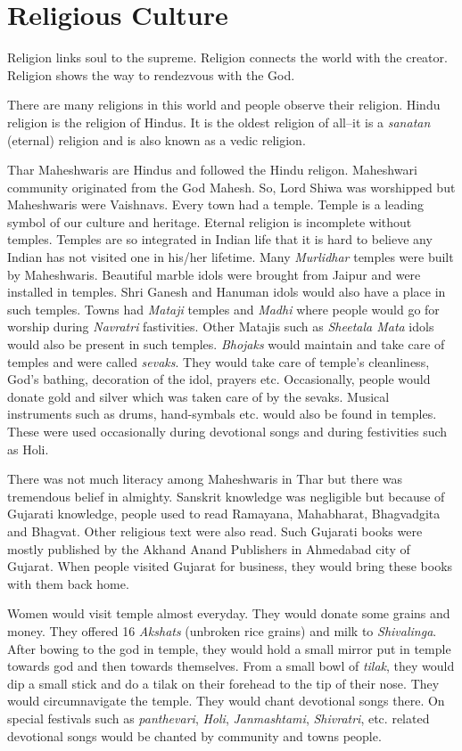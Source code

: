 \chapter{Religious Culture}
Religion links soul to the supreme. Religion connects the world with the
creator. Religion shows the way to rendezvous with the God.

There are many religions in this world and people observe their religion. Hindu
religion is the religion of Hindus. It is the oldest religion of all--it is a
\textit{sanatan} (eternal) religion and is also known as a vedic religion.

Thar Maheshwaris are Hindus and followed the Hindu religon. Maheshwari
community originated from the God Mahesh. So, Lord Shiwa was worshipped but
Maheshwaris were Vaishnavs. Every town had a temple. Temple is a leading symbol
of our culture and heritage. Eternal religion is incomplete without temples.
Temples are so integrated in Indian life that it is hard to believe any Indian
has not visited one in his/her lifetime. Many \textit{Murlidhar} temples were
built by Maheshwaris. Beautiful marble idols were brought from Jaipur and were
installed in temples. Shri Ganesh and Hanuman idols would also have a place in
such temples. Towns had \textit{Mataji} temples and \textit{Madhi} where people
would go for worship during \textit{Navratri} fastivities. Other Matajis such
as \textit{Sheetala Mata} idols would also be present in such temples.
\textit{Bhojaks} would maintain and take care of temples and were called
\textit{sevaks}. They would take care of temple's cleanliness, God's bathing,
decoration of the idol, prayers etc. Occasionally, people would donate gold and
silver which was taken care of by the sevaks. Musical instruments such as
drums, hand-symbals etc. would also be found in temples. These were used
occasionally during devotional songs and during festivities such as Holi.

There was not much literacy among Maheshwaris in Thar but there was tremendous
belief in almighty. Sanskrit knowledge was negligible but because of Gujarati
knowledge, people used to read Ramayana, Mahabharat, Bhagvadgita and Bhagvat.
Other religious text were also read. Such Gujarati books were mostly published
by the Akhand Anand Publishers in Ahmedabad city of Gujarat. When people
visited Gujarat for business, they would bring these books with them back home.

Women would visit temple almost everyday. They would donate some grains and
money. They offered 16 \textit{Akshats} (unbroken rice grains) and milk to
\textit{Shivalinga}. After bowing to the god in temple, they would hold a small
mirror put in temple towards god and then towards themselves. From a small bowl
of \textit{tilak}, they would dip a small stick and do a tilak on their
forehead to the tip of their nose. They would circumnavigate the temple. They
would chant devotional songs there. On special festivals such as
\textit{panthevari}, \textit{Holi}, \textit{Janmashtami}, \textit{Shivratri},
etc. related devotional songs would be chanted by community and towns people.

